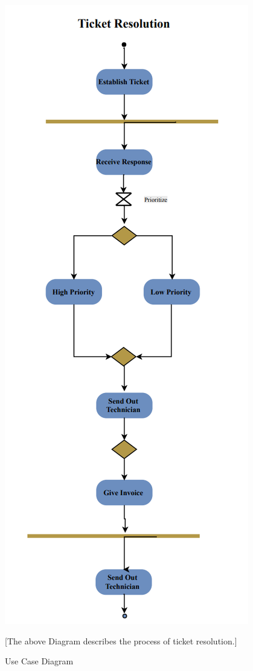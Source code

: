 \documentclass[letterpaper]{article}
\begin{document}
\begin{figure}[htbp]
  \includegraphics[]{AD_TicketRes}
  \caption{Use Case Diagram}[The above Diagram describes the process of ticket resolution.]
  \centering
\end{figure}
\end{document}
